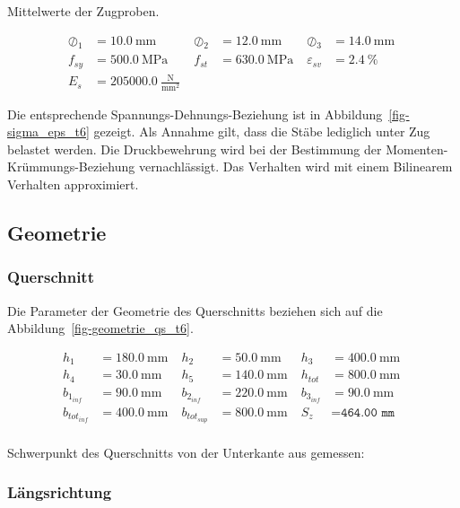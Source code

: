 \documentclass[
  11pt,
  letterpaper,
]{scrreprt}
\begin{document}
Mittelwerte der Zugproben.

$$
\begin{aligned}
\oslash_{1} &= 10.0\ \mathrm{mm} \; 
 &\oslash_{2} &= 12.0\ \mathrm{mm} \; 
 &\oslash_{3} &= 14.0\ \mathrm{mm} \; 
\\[11pt]
 f_{sy} &= 500.0\ \mathrm{MPa} \; 
 &f_{st} &= 630.0\ \mathrm{MPa} \; 
 &\varepsilon_{sv} &= 2.4\ \mathrm{\%} \; 
\\[11pt]
 E_{s} &= 205000.0\ \frac{\mathrm{N}}{\mathrm{mm}^{2}} \;
\end{aligned}
$$

Die entsprechende Spannungs-Dehnungs-Beziehung ist in
Abbildung~\ref{fig-sigma_eps_t6} gezeigt. Als Annahme gilt, dass die
Stäbe lediglich unter Zug belastet werden. Die Druckbewehrung wird bei
der Bestimmung der Momenten-Krümmungs-Beziehung vernachlässigt. Das
Verhalten wird mit einem Bilinearem Verhalten approximiert.

\subsection{Geometrie}\label{geometrie}

\subsubsection{Querschnitt}\label{querschnitt}

Die Parameter der Geometrie des Querschnitts beziehen sich auf die
Abbildung~\ref{fig-geometrie_qs_t6}.

$$
\begin{aligned}
h_{1} &= 180.0\ \mathrm{mm} \; 
 &h_{2} &= 50.0\ \mathrm{mm} \; 
 &h_{3} &= 400.0\ \mathrm{mm} \; 
\\[11pt]
 h_{4} &= 30.0\ \mathrm{mm} \; 
 &h_{5} &= 140.0\ \mathrm{mm} \; 
 &h_{tot} &= 800.0\ \mathrm{mm} \; 
\\[11pt]
 b_{1_{inf}} &= 90.0\ \mathrm{mm} \; 
 &b_{2_{inf}} &= 220.0\ \mathrm{mm} \; 
 &b_{3_{inf}} &= 90.0\ \mathrm{mm} \; 
\\[11pt]
 b_{tot_{inf}} &= 400.0\ \mathrm{mm} \; 
 &b_{tot_{sup}} &= 800.0\ \mathrm{mm} \; 
 &S_{z} &= \mathtt{\text{464.00 mm}} \; 
\\[11pt]
\end{aligned}
$$

Schwerpunkt des Querschnitts von der Unterkante aus gemessen:

\subsubsection{Längsrichtung}\label{luxe4ngsrichtung}
\end{document}
